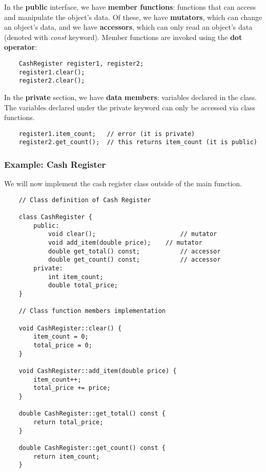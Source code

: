 \documentclass[]{article}
\begin{document}
In the \textbf{public} interface, we have \textbf{member functions}: functions that can access and manipulate the object's data. Of these, we have \textbf{mutators}, which can change an object's data, and we have \textbf{accessors}, which can only read an object's data (denoted with \textit{const} keyword). Member functions are invoked using the \textbf{dot operator}:

\begin{lstlisting}
	CashRegister register1, register2;
	register1.clear();
	register2.clear();
\end{lstlisting}\bigbreak

In the \textbf{private} section, we have \textbf{data members}: variables declared in the class. The variables declared under the private keyword can only be accessed via class functions.

\begin{lstlisting}
	register1.item_count; 	// error (it is private)
	register2.get_count(); 	// this returns item_count (it is public)
\end{lstlisting}\bigbreak 


\subsubsection{Example: Cash Register}
\bigbreak

We will now implement the cash register class outside of the main function. \\

\begin{lstlisting}
	// Class definition of Cash Register
	
	class CashRegister {
		public:
			void clear();  						// mutator
			void add_item(double price);  	// mutator
			double get_total() const; 			// accessor
			double get_count() const; 			// accessor
		private:
			int item_count;
			double total_price;
	}

	// Class function members implementation
	
	void CashRegister::clear() {
		item_count = 0;
		total_price = 0;	
	}

	void CashRegister::add_item(double price) {
		item_count++;
		total_price += price;
	}

	double CashRegister::get_total() const {
		return total_price;
	}

	double CashRegister::get_count() const {
		return item_count;
	}

\end{lstlisting}\bigbreak
\end{document}
